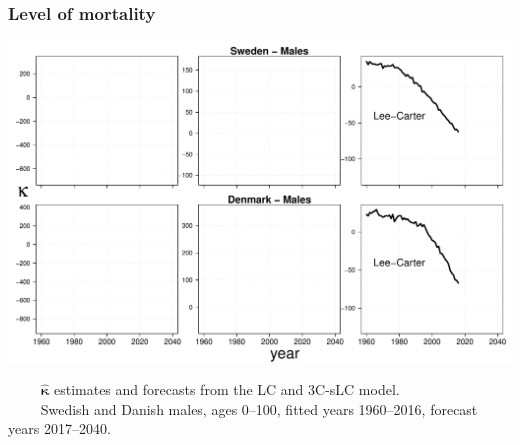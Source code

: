 \documentclass[12pt, xcolor=table]{beamer}  %
\begin{document}
\begin{frame}           
	\frametitle{Level of mortality}
	
	\vspace{-0.25cm}
	
	\begin{center}
		\includegraphics[scale=0.41]{Figures/Ch5/KappaFore1_M}
	\end{center}
\vspace{-0.3cm}	
\tiny{$\quad\quad$ $\bm{\hat{\kappa}}$ estimates and forecasts from the LC and 3C-sLC model. \\ $\quad\quad$ Swedish and Danish males, ages 0--100, fitted years 1960--2016, forecast years 2017--2040.}
	
\end{frame}
\end{document}
